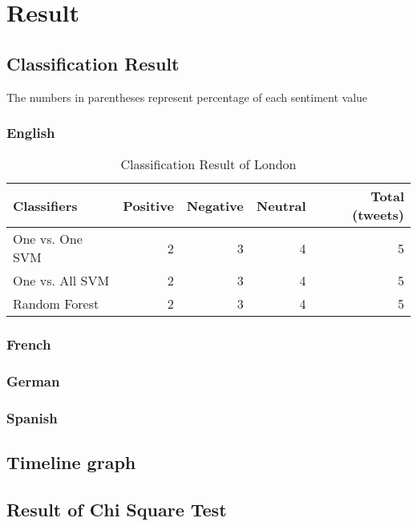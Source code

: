 \section{Result}
\subsection{Classification Result}
The numbers in parentheses represent percentage of each sentiment value
\subsubsection{English}
\begin{table}[ht]
	\caption{Classification Result of London}
	\begin{tabular}{|l|r|r|r|r|} \hline
	Classifiers & Positive & Negative & Neutral & Total (tweets)\\ \hline
	One vs. One SVM & 2 & 3 & 4 & 5\\ \hline
	One vs. All SVM & 2 & 3 & 4 & 5 \\ \hline
	Random Forest & 2 & 3 & 4 & 5\\ \hline
	\end{tabular}
	\label{tab:result_london}
\end{table}

\subsubsection{French}
\subsubsection{German}
\subsubsection{Spanish}

\subsection{Timeline graph}

\subsection{Result of Chi Square Test}
